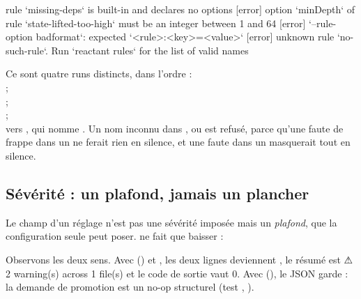 \begin{sortie}
[error] rule `missing-deps` is built-in and declares no options
[error] option `minDepth` of rule `state-lifted-too-high` must be an integer between 1 and 64
[error] `--rule-option badformat`: expected `<rule>:<key>=<value>`
[error] unknown rule `no-such-rule`. Run `reactant rules` for the list of valid names
\end{sortie}

\noindent Ce sont quatre runs distincts, dans l'ordre :\\  ;\\  ;\\  ;\\  vers , qui nomme . Un nom inconnu dans ,  ou  est refusé, parce qu'une faute de frappe dans un  ne ferait rien en silence, et une faute dans un  masquerait tout en silence.

\subsection{Sévérité : un plafond, jamais un plancher}

Le champ  d'un réglage n'est pas une sévérité imposée mais un \emph{plafond}, que la configuration seule peut poser.  ne fait que baisser :


Observons les deux sens. Avec  () et , les deux lignes deviennent , le résumé est \og ⚠ 2 warning(s) across 1 file(s)\fg{} et le code de sortie vaut 0. Avec  (), le JSON garde  : la demande de promotion est un no-op structurel (test , ).

